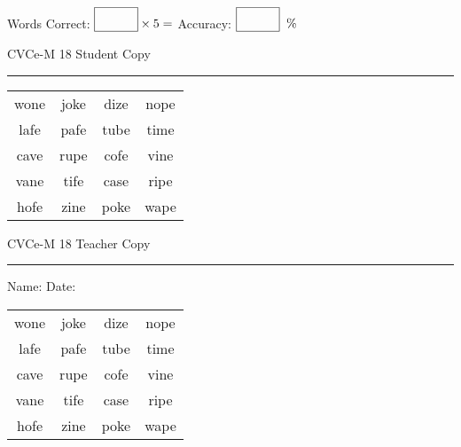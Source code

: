 \documentclass{memoir}
\begin{document}
\small

Words Correct: $\fbox{\phantom{\huge 100}} \times 5 = $ Accuracy: $\fbox{\phantom{\huge 100}}\;\; \%$ 

\vfill

\newpage


\footnotesize \noindent
CVCe-M 18 \hfill Student Copy
\smallskip
\hrule

\Large

\setlength{\tabcolsep}{14pt}
\def\arraystretch{2}

{\selectfont


\begin{vplace}[0.5]
\begin{center}
\begin{tabular}{cccc}
wone & joke & dize & nope \\
lafe & pafe & tube & time \\
cave & rupe & cofe & vine \\
vane & tife & case & ripe \\
hofe & zine & poke & wape \\
\end{tabular}
\end{center}
\end{vplace}

}

\newpage

\footnotesize \noindent
CVCe-M 18 \hfill Teacher Copy
\smallskip
\hrule

\small

\vfill

\noindent
Name: \underline{\hspace{1.75in}} \hfill Date: \underline{\hspace{1in}}

\Large

{\selectfont


\begin{vplace}[0.5]
\begin{center}
\begin{tabular}{cccc}
wone & joke & dize & nope \\
lafe & pafe & tube & time \\
cave & rupe & cofe & vine \\
vane & tife & case & ripe \\
hofe & zine & poke & wape \\
\end{tabular}
\end{center}
\end{vplace}



}
\end{document}
